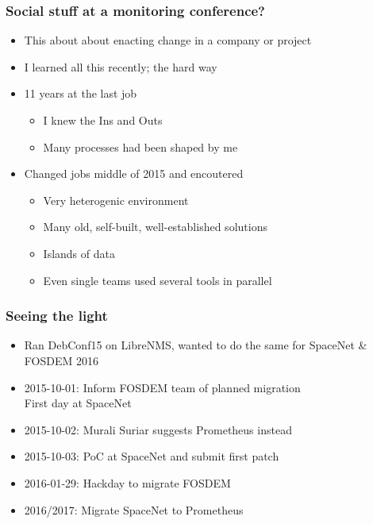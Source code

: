 \documentclass[t]{beamer}
\begin{document}
\begin{frame}
	\frametitle{Social stuff at a monitoring conference?}
	\begin{itemize}
		\item This about about enacting change in a company or project
		\item I learned all this recently; the hard way
		\item 11 years at the last job
		\begin{itemize}
			\item I knew the Ins and Outs
			\item Many processes had been shaped by me
		\end{itemize}
		\item Changed jobs middle of 2015 and encoutered
		\begin{itemize}
			\item Very heterogenic environment
			\item Many old, self-built, well-established solutions
			\item Islands of data
			\item Even single teams used several tools in parallel
		\end{itemize}
	\end{itemize}
\end{frame}


\begin{frame}
	\frametitle{Seeing the light}
	\begin{itemize}
		\item Ran DebConf15 on LibreNMS, wanted to do the same for SpaceNet \& FOSDEM 2016
		\item 2015-10-01: Inform FOSDEM team of planned migration \\
			\qquad \qquad \qquad First day at SpaceNet
		\item 2015-10-02: Murali Suriar suggests Prometheus instead
		\item 2015-10-03: PoC at SpaceNet and submit first patch
		\item 2016-01-29: Hackday to migrate FOSDEM
		\item 2016/2017: Migrate SpaceNet to Prometheus
	\end{itemize}
\end{frame}
\end{document}
